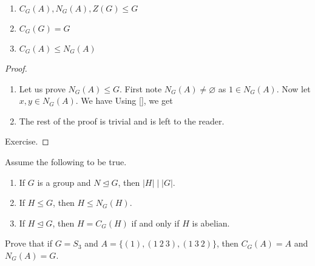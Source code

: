\documentclass[11pt,a4paper]{article}
\begin{document}
\begin{prop}\hfill\null
    \begin{enumerate}[label=(\roman*)]
        \item \(C_G(A) , N_G(A), Z(G) \leq G\)
        \item \(C_G(G) = G\)
        \item \(C_G(A)\leq N_G(A)\)
    \end{enumerate}
\end{prop}

\begin{proof}
\begin{enumerate}[label=(\roman*)]
    \item Let us prove \(N_G(A) \leq G\).
    First note \(N_G(A)\neq \varnothing\) as \(1\in N_G(A)\).
    Now let \(x,y\in N_G(A)\).
    We have 
    Using \ref{}, we get 


    \item The rest of the proof is trivial and is left to the reader.
\end{enumerate}
    Exercise.
\end{proof}

\begin{eje}[Classwork]
    Assume the following to be true.
\begin{enumerate}[label=(\roman*)]
    \item If $G$ is a group and $N \trianglelefteq G$, then $|H| \mid |G|$.
    \item If $H \leq G$, then $H \leq N_G(H)$.
    \item If $H \trianglelefteq G$, then $H = C_G(H)$ if and only if $H$ is abelian.
\end{enumerate}
Prove that if $G = S_3$ and $A = \{(1), (1\ 2\ 3), (1\ 3\ 2)\}$, then $C_G(A) = A$ and $N_G(A) = G$.
\end{eje}
\end{document}
